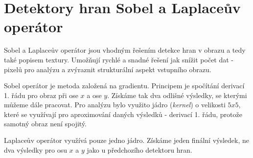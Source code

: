 




%

\section{Detektory hran Sobel a Laplaceův operátor}
Sobel a Laplaceův operátor jsou vhodným řešením detekce hran v obrazu a tedy také popisem textury. Umožňují rychlé a snadné řešení jak snížit počet dat - pixelů pro analýzu a zvýraznit strukturální aspekt vstupního obrazu. 

Sobel operátor je metoda založená na gradientu. Principem je spočítání derivací 1. řádu pro obraz při ose $x$ a ose $y$. Získáme tak dva odlišné výsledky, se kterými můžeme dále pracovat. Pro analýzu bylo využito jádro (\textit{kernel}) o velikosti $5x5$, které se využívají pro aproximování daných výsledků - derivací 1. řádu, protože samotný obraz není spojitý. 

Laplaceův operátor využívá pouze jedno jádro. Získáme jeden finální výsledek, ne dva výsledky pro osu $x$ a $y$ jako u předchozího detektoru hran. \cite{SobelLaplacianDetectors}

